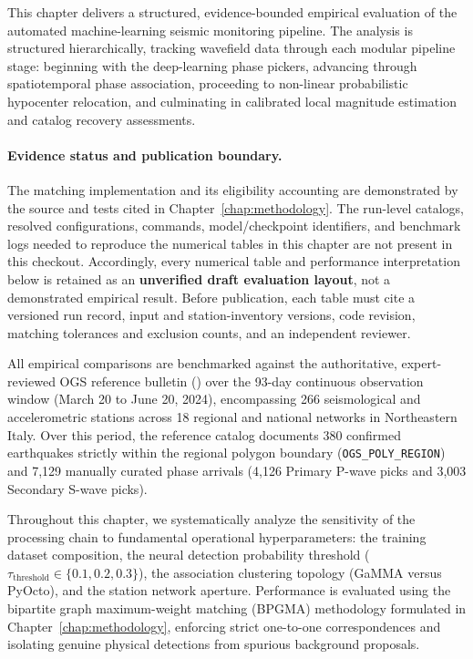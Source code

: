 
\label{chap:results}

This chapter delivers a structured, evidence-bounded empirical evaluation of the automated machine-learning seismic monitoring pipeline. The analysis is structured hierarchically, tracking wavefield data through each modular pipeline stage: beginning with the deep-learning phase pickers, advancing through spatiotemporal phase association, proceeding to non-linear probabilistic hypocenter relocation, and culminating in calibrated local magnitude estimation and catalog recovery assessments.

\paragraph{Evidence status and publication boundary.} The matching implementation and its eligibility accounting are demonstrated by the source and tests cited in Chapter~\ref{chap:methodology}. The run-level catalogs, resolved configurations, commands, model/checkpoint identifiers, and benchmark logs needed to reproduce the numerical tables in this chapter are not present in this checkout. Accordingly, every numerical table and performance interpretation below is retained as an \textbf{unverified draft evaluation layout}, not a demonstrated empirical result. Before publication, each table must cite a versioned run record, input and station-inventory versions, code revision, matching tolerances and exclusion counts, and an independent reviewer.

All empirical comparisons are benchmarked against the authoritative, expert-reviewed \ac{OGS} reference bulletin (\cite{SMINO}) over the 93-day continuous observation window (March 20 to June 20, 2024), encompassing 266 seismological and accelerometric stations across 18 regional and national networks in Northeastern Italy. Over this period, the reference catalog documents 380 confirmed earthquakes strictly within the regional polygon boundary (\texttt{OGS\_POLY\_REGION}) and 7,129 manually curated phase arrivals (4,126 Primary P-wave picks and 3,003 Secondary S-wave picks).

Throughout this chapter, we systematically analyze the sensitivity of the processing chain to fundamental operational hyperparameters: the training dataset composition, the neural detection probability threshold ($\tau_{\mathrm{threshold}} \in \{0.1, 0.2, 0.3\}$), the association clustering topology (\ac{GaMMA} versus \ac{PyOcto}), and the station network aperture. Performance is evaluated using the bipartite graph maximum-weight matching (\ac{BPGMA}) methodology formulated in Chapter~\ref{chap:methodology}, enforcing strict one-to-one correspondences and isolating genuine physical detections from spurious background proposals.

